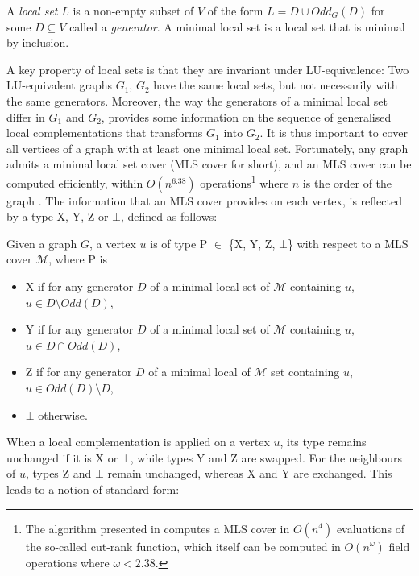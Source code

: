\documentclass[a4paper,UKenglish,cleveref,autoref,thm-restate]{arxiv}
\newcommand{\se}{\subseteq}
\newcommand{\sm}{\setminus}
\begin{document}
\begin{definition} A \emph{local set} $L$ is a non-empty subset of $V$ of the form $L = D \cup Odd_G(D)$ for some $D \se V$ called a \emph{generator}. A minimal local set is a local set that is minimal by inclusion.
\end{definition}

A key property of local sets is that they are invariant under LU-equivalence: Two LU-equivalent graphs $G_1$, $G_2$ have the same local sets, but not necessarily with the same generators. Moreover, the way the generators of a minimal local set differ in $G_1$ and $G_2$, 
provides some information on the sequence of generalised local complementations that transforms $G_1$ into $G_2$. 
It is thus important to cover all vertices of a graph with at least one minimal local set. Fortunately, any graph admits a minimal local set cover (MLS cover for short), and an MLS cover can be computed efficiently, within   $O(n^{6.38})$ operations\footnote{The algorithm presented in \cite{claudet2024covering} computes a MLS cover in $O(n^4)$ evaluations of the so-called cut-rank function, which itself can be computed in $O(n^\omega)$ field operations where $\omega < 2.38$.} where $n$ is the order of the graph \cite{claudet2024covering}. The information that an MLS cover provides on each vertex, is reflected by a type X, Y, Z or $\bot$, defined as follows:


\begin{definition} \label{def:type}Given a graph $G$, a vertex $u$ is of type P $\in$ \{X, Y, Z, $\bot$\} with respect to a MLS cover $\mathcal M$, where P is
    \begin{itemize}
        \item  X if for any generator $D$ of a minimal local set of $\mathcal M$ containing $u$, $u\in D \sm Odd(D)$,
        \item  Y if for any generator $D$ of a minimal local set of $\mathcal M$ containing $u$, $u\in D \cap Odd(D)$, 
        \item Z if for any generator $D$ of a minimal local of $\mathcal M$ set containing $u$, $u\in Odd(D) \sm D$, 
        \item $\bot$ otherwise. 
    \end{itemize}
    \end{definition}
        
When a local complementation is applied on a vertex $u$, its type remains unchanged if it is X or $\bot$, while types Y and Z are swapped. For the neighbours of $u$, types Z and  $\bot$ remain unchanged, whereas  X and  Y are exchanged. This leads to a notion of standard form: 
    
\end{document}
